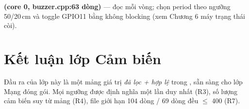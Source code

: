 \textbf{ (core 0, buzzer.cpp:63 dòng)} — đọc
 mỗi vòng; chọn period theo ngưỡng 50/20\,cm và
toggle GPIO11 bằng  không blocking (xem Chương 6 máy trạng
thái còi).

\section{Kết luận lớp Cảm biến}

Đầu ra của lớp này là một mảng  giá trị \emph{đã lọc +
hợp lệ} trong , sẵn sàng cho lớp Mạng đóng gói. Mọi ngưỡng
được định nghĩa một lần duy nhất (R3), số lượng cảm biến suy từ mảng (R4), file
giới hạn  104 dòng /  69
dòng đều $\le$ 400 (R7).